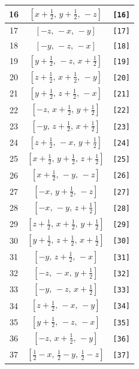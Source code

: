 \documentclass[fleqn,8pt]{jsarticle}
\begin{document}
\begin{longtable}{ccc}
16 & $\left[ x + \frac{1}{2},\, y + \frac{1}{2},\, - z \right]$ & {\tt [16]} \\ \hline
17 & $\left[ - z,\, - x,\, - y \right]$ & {\tt [17]} \\ \hline
18 & $\left[ - y,\, - z,\, - x \right]$ & {\tt [18]} \\ \hline
19 & $\left[ y + \frac{1}{2},\, - z,\, x + \frac{1}{2} \right]$ & {\tt [19]} \\ \hline
20 & $\left[ z + \frac{1}{2},\, x + \frac{1}{2},\, - y \right]$ & {\tt [20]} \\ \hline
21 & $\left[ y + \frac{1}{2},\, z + \frac{1}{2},\, - x \right]$ & {\tt [21]} \\ \hline
22 & $\left[ - z,\, x + \frac{1}{2},\, y + \frac{1}{2} \right]$ & {\tt [22]} \\ \hline
23 & $\left[ - y,\, z + \frac{1}{2},\, x + \frac{1}{2} \right]$ & {\tt [23]} \\ \hline
24 & $\left[ z + \frac{1}{2},\, - x,\, y + \frac{1}{2} \right]$ & {\tt [24]} \\ \hline
25 & $\left[ x + \frac{1}{2},\, y + \frac{1}{2},\, z + \frac{1}{2} \right]$ & {\tt [25]} \\ \hline
26 & $\left[ x + \frac{1}{2},\, - y,\, - z \right]$ & {\tt [26]} \\ \hline
27 & $\left[ - x,\, y + \frac{1}{2},\, - z \right]$ & {\tt [27]} \\ \hline
28 & $\left[ - x,\, - y,\, z + \frac{1}{2} \right]$ & {\tt [28]} \\ \hline
29 & $\left[ z + \frac{1}{2},\, x + \frac{1}{2},\, y + \frac{1}{2} \right]$ & {\tt [29]} \\ \hline
30 & $\left[ y + \frac{1}{2},\, z + \frac{1}{2},\, x + \frac{1}{2} \right]$ & {\tt [30]} \\ \hline
31 & $\left[ - y,\, z + \frac{1}{2},\, - x \right]$ & {\tt [31]} \\ \hline
32 & $\left[ - z,\, - x,\, y + \frac{1}{2} \right]$ & {\tt [32]} \\ \hline
33 & $\left[ - y,\, - z,\, x + \frac{1}{2} \right]$ & {\tt [33]} \\ \hline
34 & $\left[ z + \frac{1}{2},\, - x,\, - y \right]$ & {\tt [34]} \\ \hline
35 & $\left[ y + \frac{1}{2},\, - z,\, - x \right]$ & {\tt [35]} \\ \hline
36 & $\left[ - z,\, x + \frac{1}{2},\, - y \right]$ & {\tt [36]} \\ \hline
37 & $\left[ \frac{1}{2} - x,\, \frac{1}{2} - y,\, \frac{1}{2} - z \right]$ & {\tt [37]} \\ \hline

\end{longtable}
\end{document}

